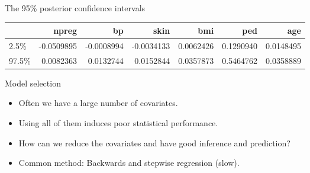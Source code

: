 \documentclass[ignorenonframetext,]{beamer}
\newenvironment{Shaded}{\begin{snugshade}}{\end{snugshade}}
\newcommand{\KeywordTok}[1]{\textcolor[rgb]{0.13,0.29,0.53}{\textbf{#1}}}
\newcommand{\DecValTok}[1]{\textcolor[rgb]{0.00,0.00,0.81}{#1}}
\newcommand{\FloatTok}[1]{\textcolor[rgb]{0.00,0.00,0.81}{#1}}
\newcommand{\StringTok}[1]{\textcolor[rgb]{0.31,0.60,0.02}{#1}}
\newcommand{\CommentTok}[1]{\textcolor[rgb]{0.56,0.35,0.01}{\textit{#1}}}
\newcommand{\NormalTok}[1]{#1}
\begin{document}
\begin{frame}[fragile]{The 95\% posterior confidence intervals}

\footnotesize

\begin{Shaded}
\end{Shaded}

\begin{longtable}[]{@{}lrrrrrr@{}}
\toprule
& npreg & bp & skin & bmi & ped & age\tabularnewline
\midrule
\endhead
2.5\% & -0.0509895 & -0.0008994 & -0.0034133 & 0.0062426 & 0.1290940 &
0.0148495\tabularnewline
97.5\% & 0.0082363 & 0.0132744 & 0.0152844 & 0.0357873 & 0.5464762 &
0.0358889\tabularnewline
\bottomrule
\end{longtable}

\end{frame}

\begin{frame}{Model selection}

\begin{itemize}
\item Often we have a large number of covariates.
\item Using all of them induces poor statistical performance.
\item How can we reduce the covariates and have good inference and prediction?
\item Common method: Backwards and stepwise regression (slow). 
\end{itemize}

\end{frame}

\end{document}
